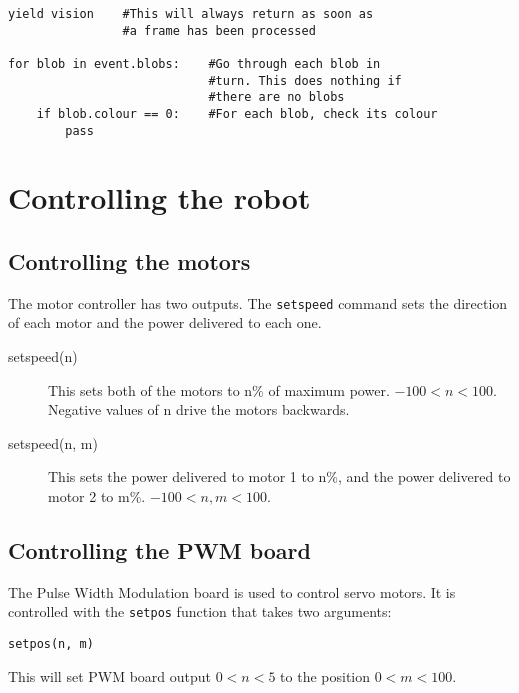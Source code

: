 \documentclass{article}
\begin{document}
\begin{verbatim}
yield vision    #This will always return as soon as
                #a frame has been processed

for blob in event.blobs:    #Go through each blob in 
                            #turn. This does nothing if
                            #there are no blobs
    if blob.colour == 0:    #For each blob, check its colour
        pass
\end{verbatim}

\section{Controlling the robot}
\subsection{Controlling the motors}
The motor controller has two outputs.  The \texttt{setspeed} command
sets the direction of each motor and the power delivered to each one.

\begin{description}
\item[setspeed(n)] This sets both of the motors to n\% of maximum
power.  $-100<n<100$. Negative values of n drive the motors backwards.
\item[setspeed(n, m)] This sets the power delivered to motor 1 to n\%,
  and the power delivered to motor 2 to m\%. $-100<n,m<100$.
\end{description}

\subsection{Controlling the PWM board}
The Pulse Width Modulation board is used to control servo motors.  It is
controlled with the \texttt{setpos} function that takes two arguments:

\begin{verbatim}
setpos(n, m)
\end{verbatim}

This will set PWM board output $0<n<5$ to the position $0<m<100$.
\end{document}
